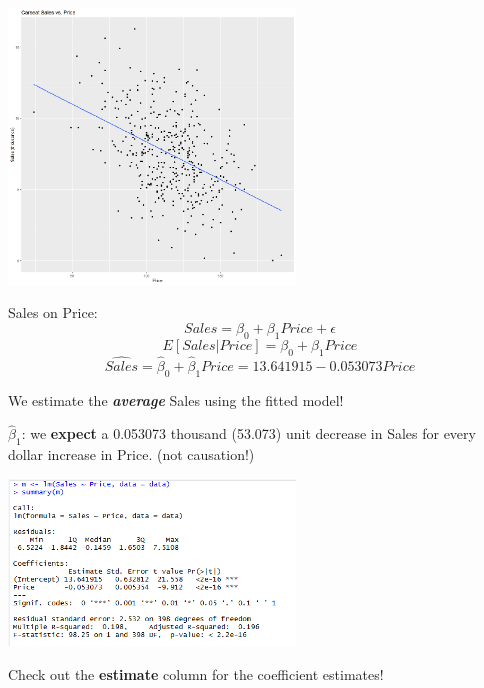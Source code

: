 \begin{frame}
\begin{center}
	\includegraphics[width = 3in]{SalesPricePointsLine.png}
\end{center}
\end{frame}

\begin{frame}
\bi
	\item Sales on Price:
	\[
		Sales = \beta_0 + \beta_1 Price + \epsilon
	\]
	\pause
	\[
		E[Sales \vert Price] = \beta_0 + \beta_1 Price
	\]
	\pause
	\[
		\hat{Sales} = \hat{\beta}_0 + \hat{\beta}_1 Price = 13.641915 - 0.053073Price
	\]
	
	\item We estimate the \textbf{\emph{average}} Sales using the fitted model!
	\item $\hat{\beta}_1$: we \textbf{expect} a 0.053073 thousand (53.073) unit decrease in Sales for every dollar increase in Price. (not causation!)
\ei
\end{frame}

\begin{frame}
\begin{center}
	\includegraphics[width = 3in]{SalesPriceLMoutput.png}
\end{center}
\bi
	\item Check out the \textbf{estimate} column for the coefficient estimates!
\ei
\end{frame}

